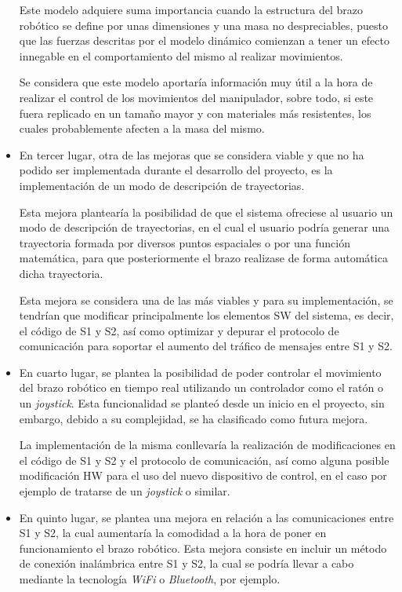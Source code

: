 \begin{itemize}
    Este modelo adquiere suma importancia cuando la estructura del brazo robótico se define por unas dimensiones y una masa no despreciables, puesto que las fuerzas descritas por el modelo dinámico comienzan a tener un efecto innegable en el comportamiento del mismo al realizar movimientos.
    
    Se considera que este modelo aportaría información muy útil a la hora de realizar el control de los movimientos del manipulador, sobre todo, si este fuera replicado en un tamaño mayor y con materiales más resistentes, los cuales probablemente afecten a la masa del mismo.
    
    \item En tercer lugar, otra de las mejoras que se considera viable y que no ha podido ser implementada durante el desarrollo del proyecto, es la implementación de un modo de descripción de trayectorias.
    
    Esta mejora plantearía la posibilidad de que el sistema ofreciese al usuario un modo de descripción de trayectorias, en el cual el usuario podría generar una trayectoria formada por diversos puntos espaciales o por una función matemática, para que posteriormente el brazo realizase de forma automática dicha trayectoria.
    
    Esta mejora se considera una de las más viables y para su implementación, se tendrían que modificar principalmente los elementos \ac{SW} del sistema, es decir, el código de \ac{S1} y \ac{S2}, así como optimizar y depurar el protocolo de comunicación para soportar el aumento del tráfico de mensajes entre \ac{S1} y \ac{S2}.
    
    \item En cuarto lugar, se plantea la posibilidad de poder controlar el movimiento del brazo robótico en tiempo real utilizando un controlador como el ratón o un \textit{joystick}. Esta funcionalidad se planteó desde un inicio en el proyecto, sin embargo, debido a su complejidad, se ha clasificado como futura mejora.
    
    La implementación de la misma conllevaría la realización de modificaciones en el código de \ac{S1} y \ac{S2} y el protocolo de comunicación, así como alguna posible modificación \ac{HW} para el uso del nuevo dispositivo de control, en el caso por ejemplo de tratarse de un \textit{joystick} o similar.
    
    \item En quinto lugar, se plantea una mejora en relación a las comunicaciones entre \ac{S1} y \ac{S2}, la cual aumentaría la comodidad a la hora de poner en funcionamiento el brazo robótico. Esta mejora consiste en incluir un método de conexión inalámbrica entre \ac{S1} y \ac{S2}, la cual se podría llevar a cabo mediante la tecnología \textit{WiFi} o \textit{Bluetooth}, por ejemplo.
    

\end{itemize}
